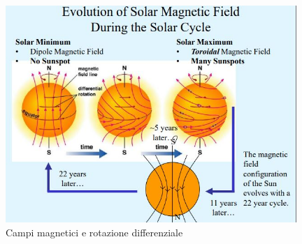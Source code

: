 \documentclass[a4paper,11pt]{article}
\begin{document}
        \begin{figure}[h!!]
            \centering
                \includegraphics[width=11cm]{2dic/RotazioneDifferenziale.jpg}
                \caption{Campi magnetici e rotazione differenziale}
            \label{fig:CampiMageRotazDiff}
        \end{figure}
        \\
        \newpage
\end{document}
